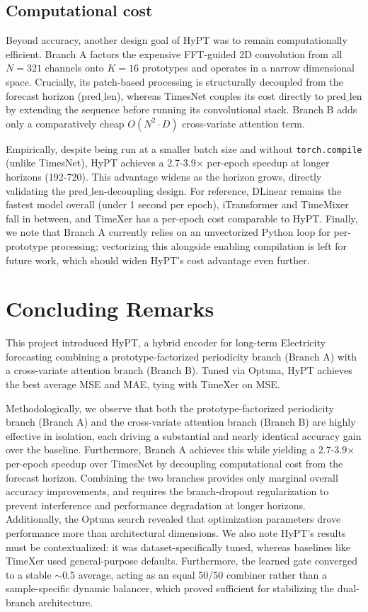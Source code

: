 \documentclass[10pt,journal]{IEEEtran}
\begin{document}
\subsection{Computational cost}
\label{sec:cost}
Beyond accuracy, another design goal of HyPT was to remain computationally efficient. Branch A factors the expensive FFT-guided 2D convolution from all $N=321$ channels onto $K=16$ prototypes and operates in a narrow dimensional space. Crucially, its patch-based processing is structurally decoupled from the forecast horizon ($\mathrm{pred\_len}$), whereas TimesNet couples its cost directly to $\mathrm{pred\_len}$ by extending the sequence before running its convolutional stack. Branch B adds only a comparatively cheap $O(N^2 \cdot D)$ cross-variate attention term.

Empirically, despite being run at a smaller batch size and without \texttt{torch.compile} (unlike TimesNet), HyPT achieves a 2.7-3.9$\times$ per-epoch speedup at longer horizons (192-720). This advantage widens as the horizon grows, directly validating the $\mathrm{pred\_len}$-decoupling design. For reference, DLinear remains the fastest model overall (under 1 second per epoch), iTransformer and TimeMixer fall in between, and TimeXer has a per-epoch cost comparable to HyPT. Finally, we note that Branch A currently relies on an unvectorized Python loop for per-prototype processing; vectorizing this alongside enabling compilation is left for future work, which should widen HyPT's cost advantage even further.


\section{Concluding Remarks}
\label{sec:conclusion}

This project introduced HyPT, a hybrid encoder for long-term Electricity forecasting combining a prototype-factorized periodicity branch (Branch A) with a cross-variate attention branch (Branch B). Tuned via Optuna, HyPT achieves the best average MSE and MAE, tying with TimeXer on MSE.

Methodologically, we observe that both the prototype-factorized periodicity branch (Branch A) and the cross-variate attention branch (Branch B) are highly effective in isolation, each driving a substantial and nearly identical accuracy gain over the baseline. Furthermore, Branch A achieves this while yielding a 2.7-3.9$\times$ per-epoch speedup over TimesNet by decoupling computational cost from the forecast horizon. Combining the two branches provides only marginal overall accuracy improvements, and requires the branch-dropout regularization to prevent interference and performance degradation at longer horizons. Additionally, the Optuna search revealed that optimization parameters drove performance more than architectural dimensions. We also note HyPT's results must be contextualized: it was dataset-specifically tuned, whereas baselines like TimeXer used general-purpose defaults. Furthermore, the learned gate converged to a stable $\sim$0.5 average, acting as an equal 50/50 combiner rather than a sample-specific dynamic balancer, which proved sufficient for stabilizing the dual-branch architecture.
\end{document}
